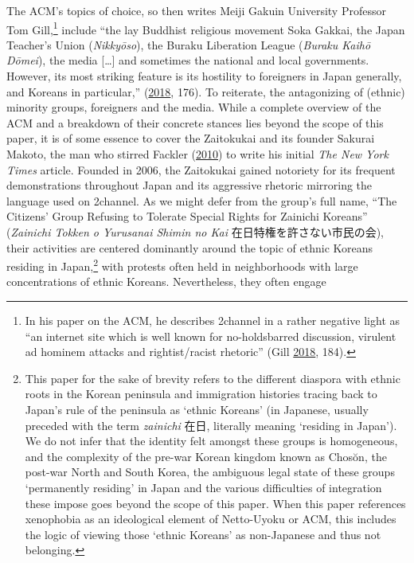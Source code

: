 \documentclass[10pt,british,A4paper,twoside]{memoir}
\begin{document}
The ACM's topics of choice, so then writes Meiji Gakuin University
Professor Tom Gill,\footnote{In his paper on the ACM, he describes
  2channel in a rather negative light as ``an internet site which is
  well known for no-holdsbarred discussion, virulent ad hominem attacks
  and rightist/racist rhetoric'' (Gill
  \protect\hyperlink{ref-gill_nativist_2018}{2018}, 184).} include ``the
lay Buddhist religious movement Soka Gakkai, the Japan Teacher's Union
(\emph{Nikkyōso}), the Buraku Liberation League (\emph{Buraku Kaihō
Dōmei}), the media {[}\ldots{}{]} and sometimes the national and local
governments. However, its most striking feature is its hostility to
foreigners in Japan generally, and Koreans in particular,''
(\protect\hyperlink{ref-gill_nativist_2018}{2018}, 176). To reiterate,
the antagonizing of (ethnic) minority groups, foreigners and the media.
While a complete overview of the ACM and a breakdown of their concrete
stances lies beyond the scope of this paper, it is of some essence to
cover the Zaitokukai and its founder Sakurai Makoto, the man who stirred
Fackler (\protect\hyperlink{ref-fackler_new_2010-1}{2010}) to write his
initial \emph{The New York Times} article. Founded in 2006, the
Zaitokukai gained notoriety for its frequent demonstrations throughout
Japan and its aggressive rhetoric mirroring the language used on
2channel. As we might defer from the group's full name, ``The Citizens'
Group Refusing to Tolerate Special Rights for Zainichi Koreans''
(\emph{Zainichi Tokken o Yurusanai Shimin no Kai}
在日特権を許さない市民の会), their activities are centered dominantly
around the topic of ethnic Koreans residing in Japan,\footnote{This
  paper for the sake of brevity refers to the different diaspora with
  ethnic roots in the Korean peninsula and immigration histories tracing
  back to Japan's rule of the peninsula as `ethnic Koreans' (in
  Japanese, usually preceded with the term \emph{zainichi} 在日,
  literally meaning `residing in Japan'). We do not infer that the
  identity felt amongst these groups is homogeneous, and the complexity
  of the pre-war Korean kingdom known as Chosŏn, the post-war North and
  South Korea, the ambiguous legal state of these groups `permanently
  residing' in Japan and the various difficulties of integration these
  impose goes beyond the scope of this paper. When this paper references
  xenophobia as an ideological element of Netto-Uyoku or ACM, this
  includes the logic of viewing those `ethnic Koreans' as non-Japanese
  and thus not belonging.} with protests often held in neighborhoods with
large concentrations of ethnic Koreans. Nevertheless, they often engage
\end{document}
